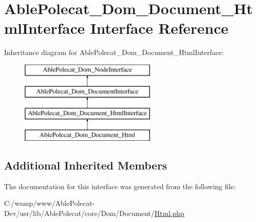 \hypertarget{interface_able_polecat___dom___document___html_interface}{}\section{Able\+Polecat\+\_\+\+Dom\+\_\+\+Document\+\_\+\+Html\+Interface Interface Reference}
\label{interface_able_polecat___dom___document___html_interface}
Inheritance diagram for Able\+Polecat\+\_\+\+Dom\+\_\+\+Document\+\_\+\+Html\+Interface\+:\begin{figure}[H]
\begin{center}
\leavevmode
\includegraphics[height=4.000000cm]{interface_able_polecat___dom___document___html_interface}
\end{center}
\end{figure}
\subsection*{Additional Inherited Members}


The documentation for this interface was generated from the following file\+:\begin{DoxyCompactItemize}
\item 
C\+:/wamp/www/\+Able\+Polecat-\/\+Dev/usr/lib/\+Able\+Polecat/core/\+Dom/\+Document/\hyperlink{_html_8php}{Html.\+php}\end{DoxyCompactItemize}
